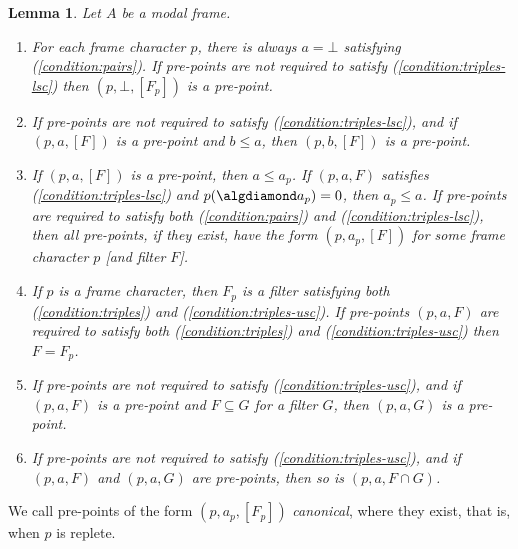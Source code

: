 \documentclass{article}[a4paper]
\newtheorem{lemma}{Lemma}%
\theoremstyle{definition}
\begin{document}
\begin{lemma}
\label{result:prepointProperties}
Let $A$ be a modal frame. 
\begin{enumerate}
\item For each frame character $p$, there is always $a = \bot$ satisfying (\ref{condition:pairs}). If pre-points are not required to satisfy (\ref{condition:triples-lsc}) then $(p, \bot, [F_p])$ is a pre-point.

\item If pre-points are not required to satisfy (\ref{condition:triples-lsc}), and if $(p,a,[F])$ is a pre-point and $b \leq a$, then $(p,b,[F])$ is a pre-point.

\item   
If  $(p,a,[F])$ is a pre-point, then $a \leq a_p$. If $(p,a,F)$ satisfies (\ref{condition:triples-lsc}) and $p(\algdiamond a_p) = 0$, then $a_p \leq a$. 
If pre-points are required to satisfy both (\ref{condition:pairs}) and (\ref{condition:triples-lsc}), then all pre-points, if they exist, have the form $(p,a_p,[F])$  for some frame character $p$ [and filter $F$]. 


\item If $p$ is a frame character, then 
$F_p$
is a filter satisfying both (\ref{condition:triples}) and (\ref{condition:triples-usc}). If pre-points $(p,a,F)$ are required to satisfy both (\ref{condition:triples}) and (\ref{condition:triples-usc}) then $F=F_p$.

\item If pre-points are not required to satisfy  (\ref{condition:triples-usc}), and if $(p,a,F)$ is a pre-point and $F\subseteq G$ for a filter $G$, then $(p,a,G)$ is a pre-point.

\item If pre-points are not required to satisfy (\ref{condition:triples-usc}), and if $(p,a,F)$ and $(p,a,G)$ are pre-points, then so is $(p,a,F\cap G)$.
\end{enumerate}
\end{lemma}

We call pre-points of the form $(p,a_p,[F_p])$ \emph{canonical}, where they exist, that is, when $p$ is replete.
\end{document}
